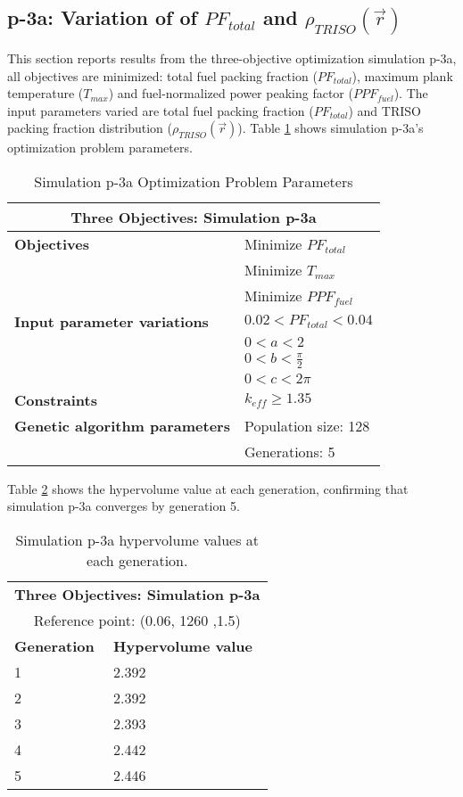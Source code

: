 \subsection{p-3a: Variation of of $PF_{total}$ and $\rho_{TRISO}(\vec{r})$}
\label{sec:p-3a}
This section reports results from the three-objective optimization simulation p-3a, all 
objectives are minimized: total fuel packing fraction ($PF_{total}$), maximum plank 
temperature ($T_{max}$) and fuel-normalized power peaking factor ($PPF_{fuel}$).  
The input parameters varied are total fuel packing fraction ($PF_{total}$) and 
TRISO packing fraction distribution ($\rho_{TRISO}(\vec{r})$). 
Table \ref{tab:simulationp3a} shows simulation p-3a's optimization problem parameters. 
\begin{table}[htbp!]
    \centering
    \onehalfspacing
    \caption{Simulation p-3a Optimization Problem Parameters}
	\label{tab:simulationp3a}
    \footnotesize
    \begin{tabular}{l|p{4cm}}
    \hline 
    \multicolumn{2}{c}{\textbf{Three Objectives: Simulation p-3a}} \\
    \hline 
    \textbf{Objectives} & Minimize $PF_{total}$ \\
    & Minimize $T_{max}$ \\
    & Minimize $PPF_{fuel}$ \\
    \hline 
    \textbf{Input parameter variations} & $0.02<PF_{total}<0.04$ \\
    & $0<a<2$ \\
    & $0<b<\frac{\pi}{2}$ \\
    & $0<c<2\pi$ \\
    \hline
    \textbf{Constraints} & $k_{eff} \geq 1.35$\\ 
    \hline 
    \textbf{Genetic algorithm parameters} & Population size: 128 \\
    & Generations: 5 \\
    \hline
    \end{tabular}
\end{table}

Table \ref{tab:p3a-hypervolume} shows the hypervolume value at each generation, 
confirming that simulation p-3a converges by generation 5. 
\begin{table}[htbp!]
    \centering
    \onehalfspacing
    \caption{Simulation p-3a hypervolume values at each generation.}
	\label{tab:p3a-hypervolume}
    \footnotesize
    \begin{tabular}{ll}
    \hline 
    \multicolumn{2}{c}{\textbf{Three Objectives: Simulation p-3a}} \\
    \multicolumn{2}{c}{Reference point: (0.06, 1260 ,1.5)} \\
    \hline 
    \textbf{Generation} & \textbf{Hypervolume value} \\
    \hline
    1 & 2.392 \\
    2 & 2.392 \\
    3 & 2.393 \\
    4 & 2.442 \\
    5 & 2.446 \\
    \hline
    \end{tabular}
\end{table}

